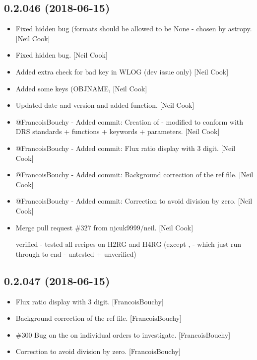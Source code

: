 \documentclass[a4paper,10pt,english]{report}
\begin{document}
\subsection{0.2.046 (2018-06-15)}
\label{\detokenize{misc/changelog:id419}}\begin{itemize}
\item {} 
Fixed hidden bug (formats should be allowed to be None - chosen by
astropy. {[}Neil Cook{]}

\item {} 
Fixed hidden bug. {[}Neil Cook{]}

\item {} 
Added extra check for bad key in WLOG (dev issue only) {[}Neil Cook{]}

\item {} 
Added some keys (OBJNAME,  {[}Neil Cook{]}

\item {} 
Updated date and version and added  function. {[}Neil
Cook{]}

\item {} 
@FrancoisBouchy - Added commit: Creation of  -
modified to conform with DRS standards + functions + keywords +
parameters. {[}Neil Cook{]}

\item {} 
@FrancoisBouchy - Added commit: Flux ratio display with 3 digit. {[}Neil
Cook{]}

\item {} 
@FrancoisBouchy - Added commit: Background correction of the ref file.
{[}Neil Cook{]}

\item {} 
@FrancoisBouchy - Added commit: Correction to avoid division by zero.
{[}Neil Cook{]}

\item {} 
Merge pull request \#327 from njcuk9999/neil. {[}Neil Cook{]}

verified - tested all recipes on H2RG and H4RG (except ,  - which just run through to end - untested + unverified)

\end{itemize}


\subsection{0.2.047 (2018-06-15)}
\label{\detokenize{misc/changelog:id420}}\begin{itemize}
\item {} 
Flux ratio display with 3 digit. {[}FrancoisBouchy{]}

\item {} 
Background correction of the ref file. {[}FrancoisBouchy{]}

\item {} 
\#300 Bug on the  on individual orders to investigate.
{[}FrancoisBouchy{]}

\item {} 
Correction to avoid division by zero. {[}FrancoisBouchy{]}

\end{itemize}
\end{document}

